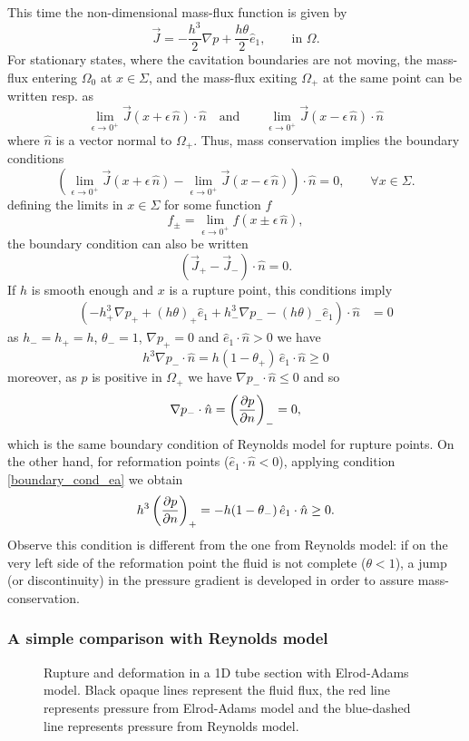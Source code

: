 This time the non-dimensional mass-flux function is given by
\begin{equation}
\vec{J}=-\frac{h^3}{2}\nabla p+\frac{h\theta}{2}\hat{e}_1,\qquad
\text{in } \Omega.
\end{equation}
For stationary states, where the cavitation boundaries are not moving, the mass-flux entering $\Omega_0$ at $x\in \Sigma$, and the mass-flux exiting $\Omega_+$ at the same point can be written resp. as
$$\underset{\epsilon \rightarrow 0^+}{\lim } \vec{J}(x+\epsilon\,\hat{n})\cdot \hat{n}\quad \text{and}\qquad \underset{\epsilon \rightarrow 0^+}{\lim } \vec{J}(x-\epsilon\,\hat{n})\cdot \hat{n}$$
where $\hat{n}$ is a vector normal to $\Omega_+$. Thus, mass conservation implies the boundary conditions
$$
\left(\underset{\epsilon \rightarrow 0^+}{\lim } \vec{J}(x+\epsilon\,\hat{n})-\underset{\epsilon \rightarrow 0^+}{\lim } \vec{J}(x-\epsilon\,\hat{n})\right) \cdot \hat{n}=0,\qquad\forall x\in \Sigma.
$$
defining the limits in $x\in \Sigma$ for some function $f$ $$f_\pm=\underset{\epsilon \rightarrow 0^+}{\lim } f(x\pm\epsilon\,\hat{n}),$$
the boundary condition can also be written
\begin{equation}
\left( \vec{J}_+ - \vec{J}_- \right) \cdot \hat{n}=0.\label{eq:boundary_cond_ea}
\end{equation}
If $h$ is smooth enough and $x$ is a rupture point, this conditions imply
\begin{align*}
\left(-h^3_+\nabla p_++ (h\theta)_+ \hat{e}_1 + h_-^3\nabla p_--(h\theta)_-\hat{e}_1\right)\cdot \hat{n}&=0
\end{align*}
as $h_-=h_+=h$, $\theta_-=1$, $\nabla p _+=0$ and $\hat{e}_1\cdot \hat{n}>0$ we have $$h^3\nabla p_-\cdot \hat{n} = h(1-\theta_+)\,\hat{e}_1\cdot\hat{n}\geq 0$$
moreover, as $p$ is positive in $\Omega_+$ we have $\nabla p_-\cdot \hat{n}\leq 0$ and so
$$\nabla p_-\cdot\hat{n}=\left(\frac{\partial p}{\partial n}\right)_-=0,$$
which is the same boundary condition of Reynolds model for rupture points. On the other hand, for reformation points ($\hat{e}_1\cdot \hat{n}<0$), applying condition \eqref*{boundary_cond_ea} we obtain
$$h^3\left(\frac{\partial p}{\partial n}\right)_+=-h(1-\theta_-)\,\hat{e}_1\cdot \hat{n}\geq 0.$$
Observe this condition is different from the one from Reynolds model: if on the very left side of the reformation point the fluid is not complete ($\theta<1$), a jump (or discontinuity) in the pressure gradient is developed in order to assure mass-conservation.

\subsubsection*{A simple comparison with Reynolds model}
\begin{figure}[h!]
\centering 
\def\svgwidth{\textwidth}	
\caption[1D rupture and reformation scheme with Elrod-Adams model]{Rupture and deformation in a 1D tube section with Elrod-Adams model. Black opaque lines represent the fluid flux, the red line represents pressure from Elrod-Adams model and the blue-dashed line represents pressure from Reynolds model.}\label{fig:mass_cons_example2}
\end{figure}

